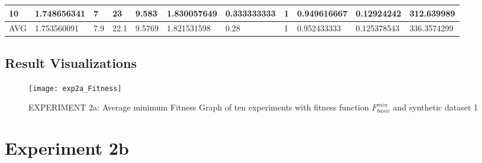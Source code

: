 \begin{table}[H]
\begin{adjustbox}{max width=380pt,keepaspectratio,angle=90}
\begin{tabular}{|l|l|l|l|l|l|l|l|l|l|l|}
					10         & 1.748656341 & 7          & 23         & 9.583      & 1.830057649 & 0.333333333 & 1           & 0.949616667 & 0.12924242  & 312.639989  \\ \hline\hline
					AVG        & 1.753560091 & 7.9        & 22.1       & 9.5769     & 1.821531598 & 0.28        & 1           & 0.952433333 & 0.125378543 & 336.3574299 \\ \hline						
				\end{tabular}
			\end{adjustbox}	
		\end{table}
	\subsection{Result Visualizations}
	\label{sec:A_Exp2a_Diagrams}
		\begin{figure}[H]
			\centering
			\texttt{[image: exp2a\_Fitness]}
			\caption{EXPERIMENT 2a: Average minimum Fitness Graph of ten experiments with fitness function $F_{basic}^{min}$ and synthetic dataset 1}
			\label{fig:exp2afitness}
		\end{figure}
	
\section{Experiment 2b}
\label{sec:A_Exp2b}
